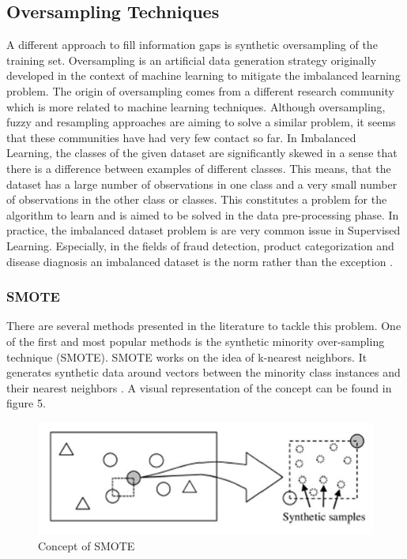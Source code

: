 \documentclass[parskip=full]{scrartcl}
\begin{document}
\subsection{Oversampling Techniques}

A different approach to fill information gaps is synthetic oversampling of the
training set. Oversampling is an artificial data generation strategy originally
developed in the context of machine learning to mitigate the imbalanced 
learning problem. The origin of oversampling comes from a different research 
community which is more related to machine learning techniques. Although 
oversampling, fuzzy and resampling approaches are aiming to solve a similar 
problem, it seems that these communities have had very few contact so far. In 
Imbalanced Learning, the classes of the given dataset are significantly skewed 
in a sense that there is a difference between examples of different classes. 
This means, that the dataset has a large number of observations in one class 
and a very small number of observations in the other class or classes. This 
constitutes a problem for the algorithm to learn and is aimed to be solved in 
the data pre-processing phase. In practice, the imbalanced dataset problem is 
are very common issue in Supervised Learning. Especially, in the fields of 
fraud detection, product categorization and disease diagnosis an imbalanced 
dataset is the norm rather than the exception \cite{He.2013}. 

\subsubsection{SMOTE}

There are several methods presented in the literature to tackle this problem.
One of the first and most popular methods is the synthetic minority
over-sampling technique (SMOTE). SMOTE works on the idea of k-nearest
neighbors. It generates synthetic data around vectors between the minority
class instances and their nearest neighbors \cite{Chawla.2002}. A visual
representation of the concept can be found in figure 5.

\begin{figure}[H]
	\centering
	\includegraphics[width=0.5\linewidth]{./Resources/smote}
	\caption{Concept of SMOTE}
	\label{fig:smote}
\end{figure}
\end{document}
